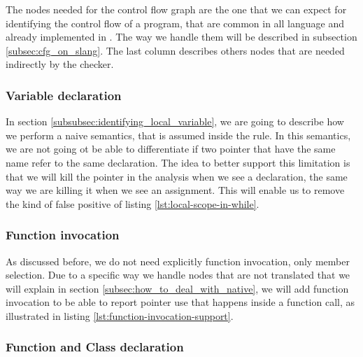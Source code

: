 The nodes needed for the control flow graph are the one that we can expect for identifying the control flow of a program, that are common in all language and already implemented in \slang{}. 
The way we handle them will be described in subsection \ref{subsec:cfg_on_slang}.
The last column describes others nodes that are needed indirectly by the checker.

\subsubsection{Variable declaration}
\label{subsubsec:variable_declaration}



In section \ref{subsubsec:identifying_local_variable}, we are going to describe how we perform a naive semantics, that is assumed inside the rule.
In this semantics, we are not going ot be able to differentiate if two pointer that have the same name refer to the same declaration. 
The idea to better support this limitation is that we will kill the pointer in the analysis when we see a declaration, the same way we are killing it when we see an assignment.
This will enable us to remove the kind of false positive of listing \ref{lst:local-scope-in-while}.

\subsubsection{Function invocation}
\label{subsubsec:function_invocation}



As discussed before, we do not need explicitly function invocation, only member selection. 
Due to a specific way we handle nodes that are not translated that we will explain in section \ref{subsec:how_to_deal_with_native}, we will add function invocation to be able to report pointer use that happens inside a function call, as illustrated in listing \ref{lst:function-invocation-support}.

\subsubsection{Function and Class declaration}
\label{subsubsec:function_class_declaration}

